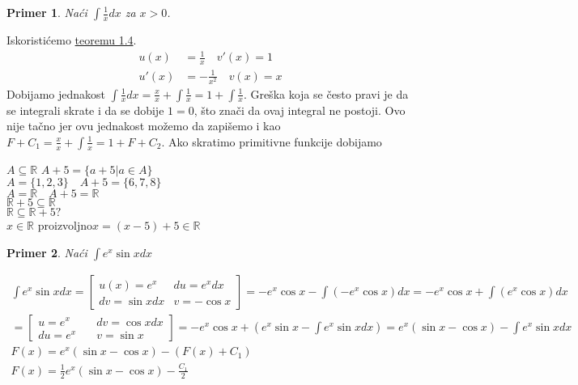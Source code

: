 \documentclass{article}
\newtheorem{prim}{Primer}[section]
\begin{document}
\begin{primbox}
    \begin{prim}
        Naći $\int \frac{1}{x} dx$ za $x > 0$.
    \end{prim}
    Iskoristićemo \hyperref[teorema_1.4]{teoremu 1.4}.
    \begin{align*}
        u(x)  & = \frac{1}{x}\quad v'(x)   = 1 \\
        u'(x) & = -\frac{1}{x^2}\quad v(x) = x
    \end{align*}
    Dobijamo jednakost $\int \frac{1}{x} dx = \frac{x}{x} + \int \frac{1}{x} = 1+ \int\frac{1}{x}$. Greška koja se
    često pravi je da se integrali skrate i da se dobije $1 = 0$, što znači da ovaj integral ne postoji.
    Ovo nije tačno jer ovu jednakost možemo da zapišemo i kao $F+C_1 = \frac{x}{x} + \int \frac{1}{x} = 1+F+C_2$.
    Ako skratimo primitivne funkcije dobijamo

\end{primbox}

$A \subseteq \mathbb{R}$ $A + 5 = \{a+5 | a \in A\}$\\
$A = \{1,2,3\}\quad A + 5 = \{6, 7, 8\}$\\
$A = \mathbb{R}\quad A + 5 = \mathbb{R}$\\
$\mathbb{R} + 5 \subseteq \mathbb{R}$\\
$\mathbb{R} \subseteq \mathbb{R} + 5 ?$\\
$x \in \mathbb{R}$ proizvoljno\quad $x = (x-5) + 5 \in \mathbb{R}$
\begin{primbox}
    \begin{prim}
        Naći $\int e^x \sin x dx$
    \end{prim}
    \begin{align*}
        \int e^x \sin x dx =
        \left [ \begin{alignedat}{2}
                        u(x) = e^x     & du = e^x dx \\
                        dv = \sin x dx & v = -\cos x
                    \end{alignedat} \right ]
        = -e^x\cos x - \int (-e^x \cos x)dx
        =  -e^x\cos x + \int (e^x \cos x) dx         \\
        = \left [ \begin{alignedat}{2}
                          u = e^x \quad  & dv = \cos x dx \\
                          du = e^x \quad & v = \sin x
                      \end{alignedat} \right ]
        =  -e^x\cos x + (e^x \sin x - \int e^x\sin x dx)
        =  e^x(\sin x - \cos x) - \int e^x \sin x dx \\
        F(x) = e^x(\sin x - \cos x) - (F(x) + C_1)   \\
        F(x) = \frac{1}{2} e^x(\sin x - \cos x) - \frac{C_1}{2}
    \end{align*}
\end{primbox}
\end{document}
